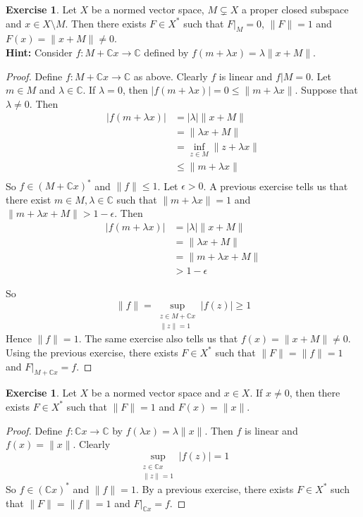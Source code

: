 \documentclass[12pt]{amsart}
\theoremstyle{definition}
\newtheorem{ex}[definition]{Exercise}
\newcommand{\lam}{\lambda}
\newcommand{\ep}{\epsilon}
\newcommand{\C}{\mathbb{C}}
\begin{document}
	\begin{ex}
		Let $X$ be a normed vector space, $M \subsetneq X$ a proper closed subspace and $x \in X \setminus M$. Then there exists $F \in X^*$ such that $F|_M = 0$, $\|F \|=1$ and $ F(x) = \|x+M \|\neq 0$. \\
		\textbf{Hint:} Consider $f:M+\C x \rightarrow \C$ defined by $f(m+\lam x) = \lam \|x +M \|$.
	\end{ex}
	
	\begin{proof}
		Define $f:M+\C x \rightarrow \C$ as above. Clearly $f$ is linear and $f|M = 0$. Let $m \in M$ and $\lam \in \C$. If $\lam = 0$, then $\vert f(m +\lam x) \vert = 0 \leq \|m+ \lam x \|$. Suppose that $\lam \neq 0$. Then 
		\begin{align*}
			\vert f(m+\lam x) \vert 
			& = \vert \lam \vert \|x+M \|\\
			& =  \|\lam x+M \|\\
			& = \inf_{z \in M} \|z+ \lam x \|\\
			& \leq  \|m+ \lam x  \|\\
		\end{align*} 
		So $f \in (M+\C x )^*$ and $\|f \|\leq 1$. Let $\ep >0$. A previous exercise tells us that there exist $m \in M, \lam \in \C$ such that $\|m+ \lam x \|= 1$ and $\|m+ \lam x +M \|> 1- \ep$. Then 
		\begin{align*}
			\vert f(m + \lam x) \vert
			&= \vert \lam \vert \|x+M\|\\
			&=\|\lam x +M \|\\
			&= \|m + \lam x +M \|\\
			&> 1-\ep
		\end{align*}
		
		So $$ \|f \|= \sup_{\substack{z \in M + \C x \\ \|z \|=1}} \vert f(z) \vert \geq 1$$ Hence $\|f \|=1$. 
		The same exercise also tells us that $f(x) = \|x+M\|\neq 0$. Using the previous exercise, there exists $F \in X^*$ such that $\|F \|= \|f \|= 1$ and $F|_{M+\C x} = f$.
	\end{proof}
	
	\begin{ex}
		Let $X$ be a normed vector space and $x \in X$. If $x \neq 0$, then there exists $F \in X^*$ such that $\|F \|= 1$ and $F(x) = \|x \|$.
	\end{ex}
	
	\begin{proof}
		Define $f:\C x \rightarrow \C$ by $f(\lam x) = \lam \|x \|$. Then $f$ is linear and $f(x) = \|x \|$. Clearly $$\sup_{\substack{z \in \C x \\ \|z \|=1}}\vert f(z) \vert = 1$$ 
		So $f \in (\C x)^*$ and $\|f \|= 1$. By a previous exercise, there exists $F \in X^*$ such that $\|F \|= \|f \|=1$ and $F|_{\C x} = f$. 
	\end{proof}
	
\end{document}
